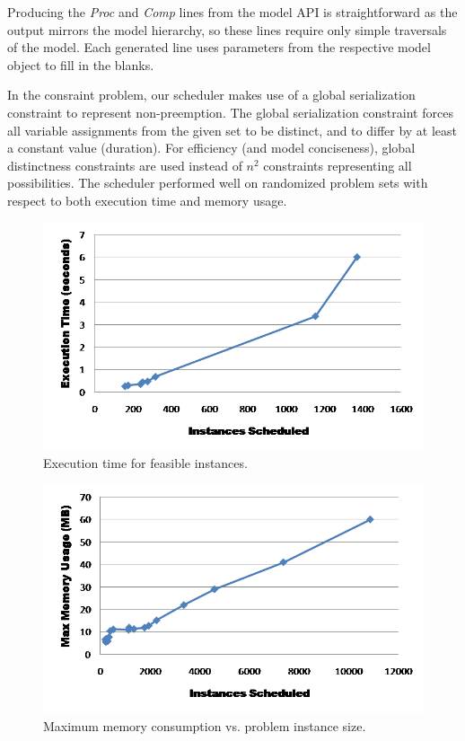 Producing the \emph{Proc} and \emph{Comp} lines from the model 
API is straightforward as the output mirrors the model
hierarchy, so these lines require only simple traversals 
of the model.  Each generated line uses parameters 
from the respective model object to fill in the blanks.  

In the consraint problem, our scheduler makes use of a global serialization constraint to represent non-preemption\cite{jp_tt_sched}.  The global serialization constraint forces all variable assignments from the given set to be distinct, and to differ by at least a constant value (duration).  For efficiency (and model conciseness), global distinctness constraints are used instead of $n^2$ constraints representing all possibilities.  The scheduler performed well on
randomized problem sets with respect to both execution time and memory usage.

\begin{figure}[thpb]
		\includegraphics[scale=.7]{img/exectime.png}
		\centering
		\caption{Execution time for feasible instances.}
	  \label{fig:exectime}
\end{figure}

\begin{figure}[thpb]
		\includegraphics[scale=.7]{img/memusage.png}
		\centering
		\caption{Maximum memory consumption vs. problem instance size.}
		\label{fig:memusage}
\end{figure}

